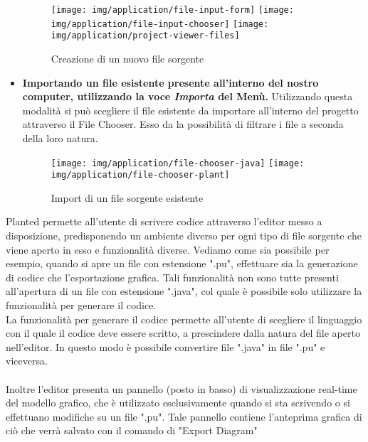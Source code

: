 \documentclass{article}
\begin{document}
\begin{appendices}
\begin{itemize}
      \begin{figure}[H]
        \centering
        \begin{framed}
          \texttt{[image: img/application/file-input-form]}
          \texttt{[image: img/application/file-input-chooser]}
          \texttt{[image: img/application/project-viewer-files]}
        \end{framed}
        \caption{Creazione di un nuovo file sorgente}
      \end{figure}
      \item \textbf{Importando un file esistente presente all'interno del nostro computer, utilizzando la voce \textit{Importa} del Menù.} Utilizzando questa modalità
      si può scegliere il file esistente da importare all'interno del progetto attraverso il File Chooser. Esso da la possibilità di filtrare i file a seconda
      della loro natura.
      \begin{figure}[H]
        \centering
        \begin{framed}
          \texttt{[image: img/application/file-chooser-java]}
          \texttt{[image: img/application/file-chooser-plant]}
        \end{framed}
        \caption{Import di un file sorgente esistente}
      \end{figure}
    \end{itemize}
    Planted permette all'utente di scrivere codice attraverso l'editor messo a disposizione, predisponendo un ambiente diverso per ogni tipo di file sorgente
    che viene aperto in esso e funzionalità diverse.
    Vediamo come sia possibile per esempio, quando si apre un file con estensione ".pu", effettuare sia la generazione di codice che l'esportazione grafica.
    Tali funzionalità non sono tutte presenti all'apertura di un file con estensione ".java", col quale è possibile solo utilizzare la funzionalità per generare
    il codice.\\La funzionalità per generare il codice permette all'utente di scegliere il linguaggio con il quale il codice deve essere scritto, a prescindere
    dalla natura del file aperto nell'editor. In questo modo è possibile convertire file ".java" in file ".pu" e viceversa.\\
    \\Inoltre l'editor presenta un pannello (posto in basso) di visualizzazione real-time del modello grafico, che è utilizzato esclusivamente quando si
    sta scrivendo o si effettuano modifiche su un file ".pu". Tale pannello contiene l'anteprima grafica di ciò che verrà salvato con il comando di "Export Diagram"

\end{appendices}
\end{document}
